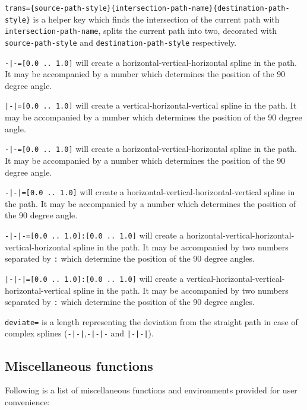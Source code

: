 \documentclass[10pt]{article}
\newenvironment{optionslist}[0]{ 
\begin{list}{}{
	\setlength{\itemindent}{-10pt}
	\setlength{\itemsep}{0pt}
	\setlength{\parsep}{0pt}
}}{\end{list}}
\newcommand\bookmark[1]{\marginpar{\ttfamily #1}}
\begin{document}
\begin{optionslist}
\item \texttt{trans=\{source-path-style\}\{intersection-path-name\}\{destination-path-style\}} is a helper key which finds the intersection of the current path with \texttt{intersection-path-name}, splits the current path into two, decorated with \texttt{source-path-style} and  \texttt{destination-path-style} respectively.
\item \texttt{-|-=[0.0 .. 1.0]} will create a horizontal-vertical-horizontal spline in the path. It may be accompanied by a number which determines the position of the 90 degree angle.
\item \texttt{|-|=[0.0 .. 1.0]} will create a vertical-horizontal-vertical spline in the path. It may be accompanied by a number which determines the position of the 90 degree angle.
\item \texttt{-|-=[0.0 .. 1.0]} will create a horizontal-vertical-horizontal spline in the path. It may be accompanied by a number which determines the position of the 90 degree angle.
\item \texttt{-|-|=[0.0 .. 1.0]} will create a horizontal-vertical-horizontal-vertical spline in the path. It may be accompanied by a number which determines the position of the 90 degree angle.
\item \texttt{-|-|-=[0.0 .. 1.0]:[0.0 .. 1.0]} will create a horizontal-vertical-horizontal-vertical-horizontal spline in the path. It may be accompanied by two numbers  separated by \texttt{:} which determine the position of the 90 degree angles.
\item \texttt{|-|-|=[0.0 .. 1.0]:[0.0 .. 1.0]} will create a vertical-horizontal-vertical-horizontal-vertical spline in the path. It may be accompanied by two numbers  separated by \texttt{:} which determine the position of the 90 degree angles.
\item \texttt{deviate=} is a length representing the deviation from the straight path in case of complex splines (\texttt{-|-|},\texttt{-|-|-} and \texttt{|-|-|}).
\end{optionslist}


\subsection{Miscellaneous functions}

Following is a list of miscellaneous functions and environments provided for user convenience:\\

\hspace{1pt}\bookmark{\texttt{\string\textleftof\{node\}\{text\}}}
\end{document}
